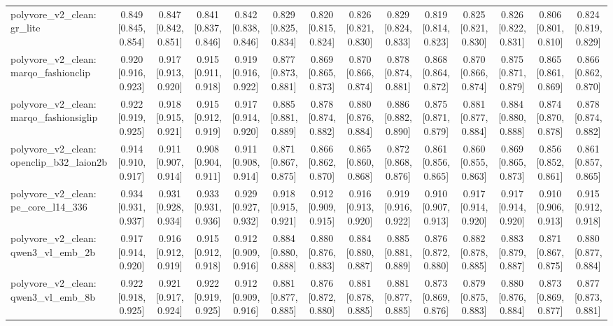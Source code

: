 \begin{table}[t]
\begin{tabular}{lccccccccccccc}
polyvore\_v2\_clean: gr\_lite & 0.849 [0.845, 0.854] & 0.847 [0.842, 0.851] & 0.841 [0.837, 0.846] & 0.842 [0.838, 0.846] & 0.829 [0.825, 0.834] & 0.820 [0.815, 0.824] & 0.826 [0.821, 0.830] & 0.829 [0.824, 0.833] & 0.819 [0.814, 0.823] & 0.825 [0.821, 0.830] & 0.826 [0.822, 0.831] & 0.806 [0.801, 0.810] & 0.824 [0.819, 0.829] \\
polyvore\_v2\_clean: marqo\_fashionclip & 0.920 [0.916, 0.923] & 0.917 [0.913, 0.920] & 0.915 [0.911, 0.918] & 0.919 [0.916, 0.922] & 0.877 [0.873, 0.881] & 0.869 [0.865, 0.873] & 0.870 [0.866, 0.874] & 0.878 [0.874, 0.881] & 0.868 [0.864, 0.872] & 0.870 [0.866, 0.874] & 0.875 [0.871, 0.879] & 0.865 [0.861, 0.869] & 0.866 [0.862, 0.870] \\
polyvore\_v2\_clean: marqo\_fashionsiglip & 0.922 [0.919, 0.925] & 0.918 [0.915, 0.921] & 0.915 [0.912, 0.919] & 0.917 [0.914, 0.920] & 0.885 [0.881, 0.889] & 0.878 [0.874, 0.882] & 0.880 [0.876, 0.884] & 0.886 [0.882, 0.890] & 0.875 [0.871, 0.879] & 0.881 [0.877, 0.884] & 0.884 [0.880, 0.888] & 0.874 [0.870, 0.878] & 0.878 [0.874, 0.882] \\
polyvore\_v2\_clean: openclip\_b32\_laion2b & 0.914 [0.910, 0.917] & 0.911 [0.907, 0.914] & 0.908 [0.904, 0.911] & 0.911 [0.908, 0.914] & 0.871 [0.867, 0.875] & 0.866 [0.862, 0.870] & 0.865 [0.860, 0.868] & 0.872 [0.868, 0.876] & 0.861 [0.856, 0.865] & 0.860 [0.855, 0.863] & 0.869 [0.865, 0.873] & 0.856 [0.852, 0.861] & 0.861 [0.857, 0.865] \\
polyvore\_v2\_clean: pe\_core\_l14\_336 & 0.934 [0.931, 0.937] & 0.931 [0.928, 0.934] & 0.933 [0.931, 0.936] & 0.929 [0.927, 0.932] & 0.918 [0.915, 0.921] & 0.912 [0.909, 0.915] & 0.916 [0.913, 0.920] & 0.919 [0.916, 0.922] & 0.910 [0.907, 0.913] & 0.917 [0.914, 0.920] & 0.917 [0.914, 0.920] & 0.910 [0.906, 0.913] & 0.915 [0.912, 0.918] \\
polyvore\_v2\_clean: qwen3\_vl\_emb\_2b & 0.917 [0.914, 0.920] & 0.916 [0.912, 0.919] & 0.915 [0.912, 0.918] & 0.912 [0.909, 0.916] & 0.884 [0.880, 0.888] & 0.880 [0.876, 0.883] & 0.884 [0.880, 0.887] & 0.885 [0.881, 0.889] & 0.876 [0.872, 0.880] & 0.882 [0.878, 0.885] & 0.883 [0.879, 0.887] & 0.871 [0.867, 0.875] & 0.880 [0.877, 0.884] \\
polyvore\_v2\_clean: qwen3\_vl\_emb\_8b & 0.922 [0.918, 0.925] & 0.921 [0.917, 0.924] & 0.922 [0.919, 0.925] & 0.912 [0.909, 0.916] & 0.881 [0.877, 0.885] & 0.876 [0.872, 0.880] & 0.881 [0.878, 0.885] & 0.881 [0.877, 0.885] & 0.873 [0.869, 0.876] & 0.879 [0.875, 0.883] & 0.880 [0.876, 0.884] & 0.873 [0.869, 0.877] & 0.877 [0.873, 0.881] \\

\end{tabular}
\end{table}
